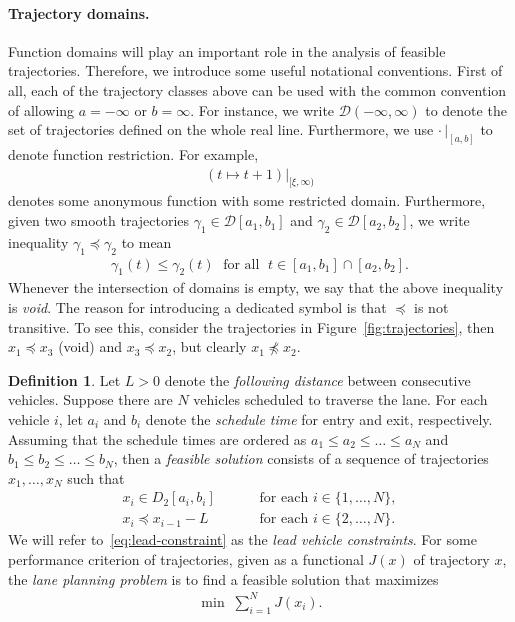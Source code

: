 \documentclass{report}
\theoremstyle{definition}
\newtheorem{define}{Definition}[chapter]
\theoremstyle{plain}
\newcommand\halfopen[2]{\ensuremath{[#1,#2)}}
\begin{document}
\paragraph{Trajectory domains.}
Function domains will play an important role in the analysis of feasible
trajectories. Therefore, we introduce some useful notational conventions.
%
First of all, each of the trajectory classes above can be used with the common
convention of allowing $a = -\infty$ or $b = \infty$. For instance, we write
$\mathcal{D}(-\infty, \infty)$ to denote the set of trajectories defined on the
whole real line.
%
Furthermore, we use $\cdot\,|_{[a,b]}$ to denote function restriction. For example,
\begin{align*}
  (t \mapsto t + 1)|_{\halfopen{\xi}{\infty}}
\end{align*}
denotes some anonymous function with some restricted domain.
%
Furthermore, given two smooth trajectories $\gamma_{1} \in \mathcal{D}[a_{1}, b_{1}]$
and $\gamma_{2} \in \mathcal{D}[a_{2}, b_{2}]$, we write inequality
  $\gamma_{1} \preceq \gamma_{2}$ to mean
\begin{align*}
\gamma_{1}(t) \leq \gamma_{2}(t) \; \text{ for all } \; t \in [a_{1}, b_{1}] \cap [a_{2}, b_{2}] .
\end{align*}
%
Whenever the intersection of domains is empty, we say that the above inequality
is \emph{void}.
%
The reason for introducing a dedicated symbol is that $\preceq$ is not transitive.
To see this, consider the trajectories in Figure~\ref{fig:trajectories}, then
$x_{1} \preceq x_{3}$ (void) and $x_{3} \preceq x_{2}$, but clearly
$x_{1} \npreceq x_{2}$.

\begin{define}
  Let $L > 0$ denote the \textit{following distance} between consecutive vehicles.
  Suppose there are $N$ vehicles scheduled to traverse the lane. For each
  vehicle $i$, let $a_{i}$ and $b_{i}$ denote the \textit{schedule time} for entry and
  exit, respectively.
  Assuming that the schedule times are ordered as
  $a_{1} \leq a_{2} \leq \dots \leq a_{N}$ and
  $b_{1} \leq b_{2} \leq \dots \leq b_{N} $, then a \emph{feasible solution} consists
  of a sequence of trajectories $x_{1}, \dots, x_{N}$ such that
\begin{subequations}\label{eq:feasibility}
\begin{align}
x_{i} \in D_{2}[a_{i}, b_{i}] \quad \quad & \text{ for each } i \in \{1, \dots, N\}, \label{eq:second-order-constraint} \\
x_{i} \preceq x_{i-1} - L \quad \quad & \text{ for each } i \in \{2, \dots, N\} . \label{eq:lead-constraint}
\end{align}
\end{subequations}
We will refer to~\eqref{eq:lead-constraint} as the \emph{lead vehicle
  constraints}.
%
For some performance criterion of trajectories, given as a functional $J(x)$ of
trajectory $x$, the \emph{lane planning problem} is to find a feasible solution that
maximizes
\begin{align}\label{eq:objective}
  \min \; \sum_{i=1}^{N} J(x_{i}) .
\end{align}
\end{define}
\end{document}
